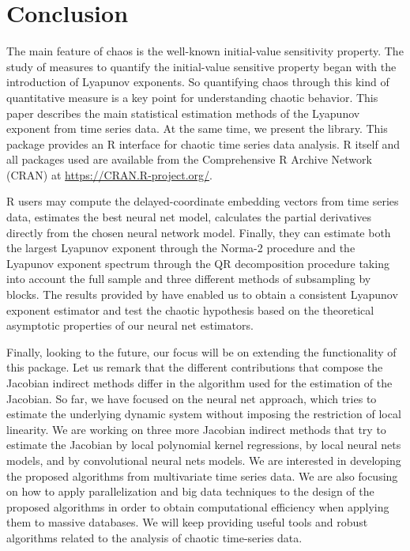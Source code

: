 
\section{Conclusion}

The main feature of chaos is the well-known initial-value sensitivity property. The study of measures to quantify the initial-value sensitive property began with the introduction of Lyapunov exponents. So quantifying chaos through this kind of quantitative measure is a key point for understanding chaotic behavior. This paper describes the main statistical estimation methods of the Lyapunov exponent from time series data. At the same time, we present the  library. This package provides an R interface for chaotic time series data analysis. R itself and all packages used are available from the Comprehensive R Archive Network (CRAN) at \url{https://CRAN.R-project.org/}.

 R users may compute the delayed-coordinate embedding vectors from time series data, estimates the best neural net model, calculates the partial derivatives directly from the chosen neural network model. Finally, they can estimate both the largest Lyapunov exponent through the Norma-2 procedure and the Lyapunov exponent spectrum through the QR decomposition procedure taking into account the full sample and three different methods of subsampling by blocks. The results provided by \cite{Shintani2004} have enabled us to obtain a consistent Lyapunov exponent estimator and test the chaotic hypothesis based on the theoretical asymptotic properties of our neural net estimators.

Finally, looking to the future, our focus will be on extending the functionality of this package. Let us remark that the different contributions that compose the Jacobian indirect methods differ in the algorithm used for the estimation of the Jacobian. So far, we have focused on the neural net approach, which tries to estimate the underlying dynamic system without imposing the restriction of local linearity. We are working on three more Jacobian indirect methods that try to estimate the Jacobian by local polynomial kernel regressions, by local neural nets models, and by convolutional neural nets models. We are interested in developing the proposed algorithms from multivariate time series data. We are also focusing on how to apply parallelization and big data techniques to the design of the proposed algorithms in order to obtain computational efficiency when applying them to massive databases. We will keep providing useful tools and robust algorithms related to the analysis of chaotic time-series data.


